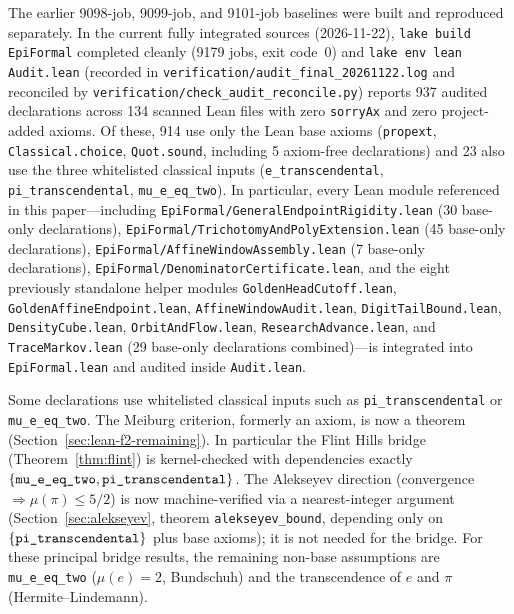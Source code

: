 \documentclass[11pt]{amsart}
\theoremstyle{definition}
\theoremstyle{remark}
\numberwithin{equation}{section}
\newcommand{\irr}{\mu}
\newcommand{\ee}{e}
\begin{document}
The earlier 9098-job, 9099-job, and 9101-job baselines were built and
reproduced separately. In the current fully integrated sources
(2026-11-22), \texttt{lake build EpiFormal} completed cleanly
(9179 jobs, exit code~0) and \texttt{lake env lean Audit.lean}
(recorded in \texttt{verification/\allowbreak audit\_\allowbreak final\_\allowbreak 20261122.log}
and reconciled by \texttt{verification/\allowbreak check\_\allowbreak audit\_\allowbreak reconcile.py})
reports 937 audited declarations across 134 scanned Lean files with zero \texttt{sorryAx} and zero
project-added axioms. Of these, 914 use only the Lean base axioms
(\texttt{propext}, \texttt{Classical.choice}, \texttt{Quot.sound},
including 5 axiom-free declarations) and 23 also use the three
whitelisted classical inputs (\texttt{e\_transcendental},
\texttt{pi\_transcendental}, \texttt{mu\_e\_eq\_two}).
In particular, every Lean module referenced in this paper---including
\texttt{EpiFormal/\allowbreak GeneralEndpoint\allowbreak Rigidity.lean}
(30 base-only declarations),
\texttt{EpiFormal/\allowbreak TrichotomyAnd\allowbreak PolyExtension.lean}
(45 base-only declarations),
\texttt{EpiFormal/\allowbreak AffineWindow\allowbreak Assembly.lean}
(7 base-only declarations),
\texttt{EpiFormal/\allowbreak Denominator\allowbreak Certificate.lean},
and the eight previously standalone helper modules
\texttt{GoldenHeadCutoff.lean}, \texttt{GoldenAffineEndpoint.lean},
\texttt{AffineWindowAudit.lean}, \texttt{DigitTailBound.lean},
\texttt{DensityCube.lean}, \texttt{OrbitAndFlow.lean},
\texttt{ResearchAdvance.lean}, and \texttt{TraceMarkov.lean}
(29 base-only declarations combined)---is integrated into
\texttt{EpiFormal.lean} and audited inside \texttt{Audit.lean}.

Some declarations use whitelisted classical inputs such
as \texttt{pi\_transcendental} or \texttt{mu\_e\_eq\_two}.
The Meiburg criterion, formerly an axiom, is now a theorem (Section~\ref{sec:lean-f2-remaining}). In particular the Flint Hills bridge (Theorem~\ref{thm:flint}) is kernel-checked with dependencies exactly $\{\texttt{mu\_\allowbreak{}e\_\allowbreak{}eq\_\allowbreak{}two},\texttt{pi\_\allowbreak{}transcendental}\}$. The Alekseyev direction (convergence $\Rightarrow\irr(\pi)\le5/2$) is now machine-verified via a nearest-integer argument (Section~\ref{sec:alekseyev}, theorem \texttt{alekseyev\_\allowbreak{}bound}, depending only on $\{\texttt{pi\_\allowbreak{}transcendental}\}$ plus base axioms); it is not needed for the bridge. For these principal bridge results, the remaining non-base assumptions are \texttt{mu\_\allowbreak{}e\_\allowbreak{}eq\_\allowbreak{}two} ($\irr(\ee)=2$, Bundschuh) and the transcendence of $\ee$ and $\pi$ (Hermite--Lindemann).
\end{document}
